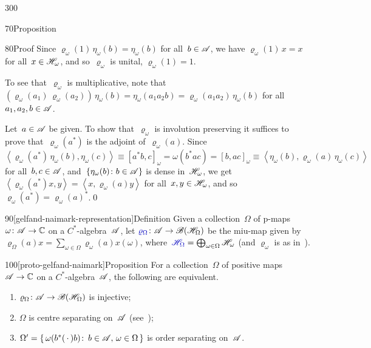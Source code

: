 \begin{parsec}{300}
\begin{point}{70}{Proposition}
\begin{point}{80}{Proof}
Since $\varrho_\omega(1)\,\eta_\omega(b)
= \eta_\omega(b)$ for all~$b\in\mathscr{A}$,
we have $\varrho_\omega(1)\,x=x$
for all~$x\in\mathscr{H}_\omega$,
and so~$\varrho_\omega$ is unital,
$\varrho_\omega(1)=1$.

To see that~$\varrho_\omega$ is multiplicative,
note that
$(\varrho_\omega(a_1)\,\varrho_\omega(a_2))\,\eta_\omega(b)
= \eta_\omega(a_1a_2b)=\varrho_\omega(a_1a_2)\,\eta_\omega(b)$
for all~$a_1,a_2,b\in\mathscr{A}$.

Let~$a\in\mathscr{A}$ be given.
To show that~$\varrho_\omega$ is involution preserving
it suffices to prove that~$\varrho_\omega(a^*)$
is the adjoint of~$\varrho_\omega(a)$.
Since~$\left<\varrho_\omega(a^*)\,\eta_\omega(b),\eta_\omega(c)\right>
\equiv [a^*b,c]_\omega = \omega(b^*ac)=[b,ac]_\omega
\equiv \left<\eta_\omega(b),\varrho_\omega(a)\,\eta_\omega(c)\right>$
for all~$b,c\in\mathscr{A}$,
and~$\{\eta_\omega(b)\colon b\in\mathscr{A}\}$
is dense in~$\mathscr{H}_\omega$,
we get~$\left<\varrho_\omega(a^*)x,y\right>=\left<x,\varrho_\omega(a)y\right>$
for all~$x,y\in\mathscr{H}_\omega$,
and so~$\varrho_\omega(a^*)=\varrho_\omega(a)^*$.\qed
\end{point}
\end{point}
\begin{point}{90}[gelfand-naimark-representation]{Definition}%
Given a collection~$\Omega$ of p-maps $\omega\colon \mathscr{A}\to\mathbb{C}$
on a $C^*$-algebra~$\mathscr{A}$,
let $\Define{\varrho_\Omega}\colon \scrA\to \scrB(\scrH_\Omega)$%
be the miu-map given by~$\varrho_\Omega(a)x 
= \sum_{\omega\in\Omega} \varrho_\omega(a)x(\omega)$,
where~$\Define{\scrH_\Omega}=\bigoplus_{\omega\in\Omega}\scrH_\omega$%
(and $\varrho_\omega$ is as in~).
\end{point}
\begin{point}{100}[proto-gelfand-naimark]{Proposition}%
For a collection~$\Omega$ of positive maps $\mathscr{A}\to \mathbb{C}$
on a $C^*$-algebra~$\mathscr{A}$,
the following are equivalent.
\begin{enumerate}
\item
\label{proto-gelfand-naimark-1}
$\varrho_\Omega\colon \mathscr{A}\to\mathscr{B}(\mathscr{H}_\Omega)$
is injective;
\item
\label{proto-gelfand-naimark-2}
$\Omega$ is centre separating on~$\mathscr{A}$
(see~);
\item
\label{proto-gelfand-naimark-3}
$\Omega'=\{\,\omega(b^*(\,\cdot\,)b)\colon \, b\in\mathscr{A},\,\omega\in\Omega\,\}$
is order separating on~$\mathscr{A}$.
\end{enumerate}

\end{point}
\end{parsec}
